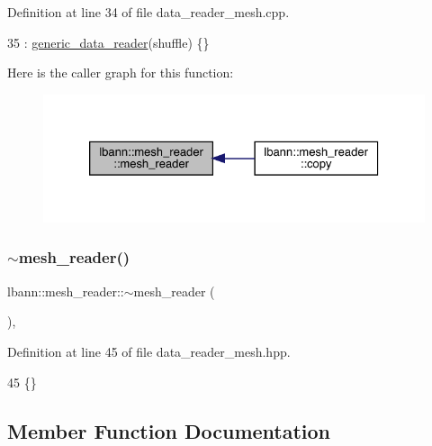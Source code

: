 Definition at line 34 of file data\+\_\+reader\+\_\+mesh.\+cpp.


\begin{DoxyCode}
35   : \hyperlink{classlbann_1_1generic__data__reader_aaba933b8f7c1227801f6e80d39986af4}{generic\_data\_reader}(shuffle) \{\}
\end{DoxyCode}
Here is the caller graph for this function\+:\nopagebreak
\begin{figure}[H]
\begin{center}
\leavevmode
\includegraphics[width=326pt]{classlbann_1_1mesh__reader_aa101fb0ec314baedda7b9453de1933b6_icgraph}
\end{center}
\end{figure}
\mbox{\label{classlbann_1_1mesh__reader_a1bff81fbd0997e604e7a86ac53112f0f}} 
\subsubsection{\texorpdfstring{$\sim$mesh\+\_\+reader()}{~mesh\_reader()}}
{\footnotesize\ttfamily lbann\+::mesh\+\_\+reader\+::$\sim$mesh\+\_\+reader (\begin{DoxyParamCaption}{ }\end{DoxyParamCaption})\hspace{0.3cm}{\ttfamily [inline]}, {\ttfamily [override]}}



Definition at line 45 of file data\+\_\+reader\+\_\+mesh.\+hpp.


\begin{DoxyCode}
45 \{\}
\end{DoxyCode}


\subsection{Member Function Documentation}
\mbox{\label{classlbann_1_1mesh__reader_a61fd5f3231815ec79eb3cf17070509f9}} 
